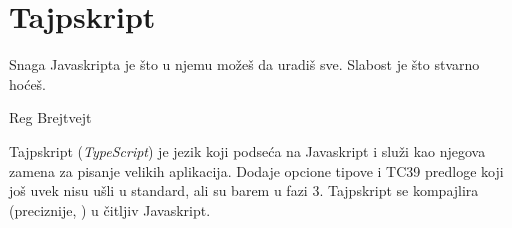 \chapter{Tajpskript}

\epigraph{
  Snaga Javaskripta je što u njemu možeš da uradiš sve.
  Slabost je što stvarno hoćeš.
}{Reg Brejtvejt}

Tajpskript (\textsl{TypeScript}) je jezik koji podseća na Javaskript i služi kao njegova zamena za pisanje velikih aplikacija.
Dodaje opcione tipove i TC39 predloge koji još uvek nisu ušli u standard, ali su barem u fazi 3.
Tajpskript se kompajlira (preciznije, ) u čitljiv Javaskript.






